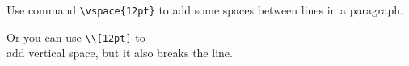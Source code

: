 \documentclass[UTF8]{ctexart}
\begin{document}
	Use command \verb|\vspace{12pt}|
	to add \vspace{12pt} some spaces
	between lines in a paragraph.

	Or you can use \verb|\\[12pt]|
	to \\[12pt] add vertical space,
	but it also breaks the line.



\end{document}
